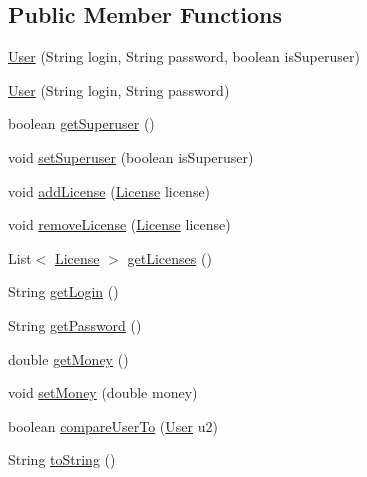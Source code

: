 \subsection*{Public Member Functions}
\begin{DoxyCompactItemize}
\item 
\hyperlink{classes_1_1deusto_1_1server_1_1db_1_1data_1_1_user_a99b61ff1f905036e1aeea2813a2fb1c1}{User} (String login, String password, boolean is\+Superuser)
\item 
\hyperlink{classes_1_1deusto_1_1server_1_1db_1_1data_1_1_user_accf4cd75adc5bfc6cd376a1714517ba9}{User} (String login, String password)
\item 
boolean \hyperlink{classes_1_1deusto_1_1server_1_1db_1_1data_1_1_user_a3b6d6d064ccfe7e0dc2a7c6c132cdfc0}{get\+Superuser} ()
\item 
void \hyperlink{classes_1_1deusto_1_1server_1_1db_1_1data_1_1_user_a386c51067e68570828d9dcd130e6fe74}{set\+Superuser} (boolean is\+Superuser)
\item 
void \hyperlink{classes_1_1deusto_1_1server_1_1db_1_1data_1_1_user_a1eefc1e49d4bf8046f3a7cdbca7f670d}{add\+License} (\hyperlink{classes_1_1deusto_1_1server_1_1db_1_1data_1_1_license}{License} license)
\item 
void \hyperlink{classes_1_1deusto_1_1server_1_1db_1_1data_1_1_user_a5ee17c4a3ab4eceb028a087f96527375}{remove\+License} (\hyperlink{classes_1_1deusto_1_1server_1_1db_1_1data_1_1_license}{License} license)
\item 
List$<$ \hyperlink{classes_1_1deusto_1_1server_1_1db_1_1data_1_1_license}{License} $>$ \hyperlink{classes_1_1deusto_1_1server_1_1db_1_1data_1_1_user_adeddbb54df77d3779f739f27959588e1}{get\+Licenses} ()
\item 
String \hyperlink{classes_1_1deusto_1_1server_1_1db_1_1data_1_1_user_a2bc07e76806b027ef70b5ad8cea5f9fa}{get\+Login} ()
\item 
String \hyperlink{classes_1_1deusto_1_1server_1_1db_1_1data_1_1_user_ac576607b3eae9e9b8c7002d5cd7c1a62}{get\+Password} ()
\item 
double \hyperlink{classes_1_1deusto_1_1server_1_1db_1_1data_1_1_user_a28bcff322718c86a4c69dcff039ecf16}{get\+Money} ()
\item 
void \hyperlink{classes_1_1deusto_1_1server_1_1db_1_1data_1_1_user_af7fe255820b6ddd9020c24994cdc6e23}{set\+Money} (double money)
\item 
boolean \hyperlink{classes_1_1deusto_1_1server_1_1db_1_1data_1_1_user_a9dee5f17849d7718c225034d384844ae}{compare\+User\+To} (\hyperlink{classes_1_1deusto_1_1server_1_1db_1_1data_1_1_user}{User} u2)
\item 
String \hyperlink{classes_1_1deusto_1_1server_1_1db_1_1data_1_1_user_a494980951c4c71c0a793994b7bcd5101}{to\+String} ()
\end{DoxyCompactItemize}


